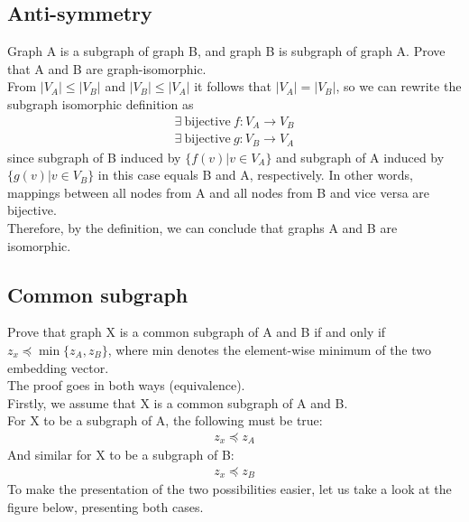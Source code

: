\documentclass[a4paper,11pt]{article}
\begin{document}
\subsection{Anti-symmetry}
Graph A is a subgraph of graph B, and graph B is subgraph of graph A. Prove that A and B are graph-isomorphic.
\\
From $|V_A| \leq |V_B|$ and $|V_B| \leq |V_A|$ it follows that $|V_A| = |V_B|$,
so we can rewrite the subgraph isomorphic definition as
\begin{align*}
    \exists \ \text{bijective} \ f : V_A \to V_B 
    \\
    \exists \ \text{bijective} \ g : V_B \to V_A 
\end{align*}
since 
subgraph of B induced by $\{ f(v) | v \in V_A \}$ 
and subgraph of A induced by $\{ g(v) | v \in V_B \}$ in this case equals B and A, respectively.
In other words, mappings between all nodes from A and all nodes from B and vice versa are bijective.
\\
Therefore, by the definition, we can conclude that graphs A and B are isomorphic.


\subsection{Common subgraph}
Prove that graph X is a common subgraph of A and B if and only if $z_x \preceq \min \{ z_A, z_B \}$, where min denotes the element-wise minimum of the two embedding vector.
\\
The proof goes in both ways (equivalence).
\\
Firstly, we assume that X is a common subgraph of A and B.
\\
For X to be a subgraph of A, the following must be true:
\begin{align*} 
    z_x \preceq z_A
\end{align*}
And similar for X to be a subgraph of B:
\begin{align*} 
    z_x \preceq z_B
\end{align*}
To make the presentation of the two possibilities easier, let us take a look at the figure below, presenting both cases.
\end{document}
